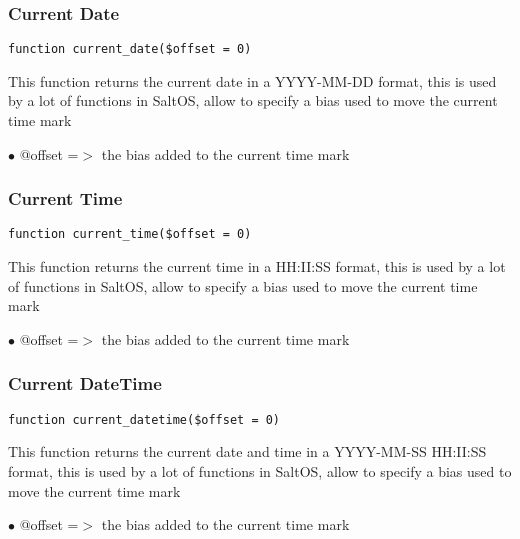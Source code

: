 \documentclass[a4paper]{article}
\begin{document}
\subsubsection{Current Date}

\begin{lstlisting}
function current_date($offset = 0)
\end{lstlisting}

This function returns the current date in a YYYY-MM-DD format, this is used
by a lot of functions in SaltOS, allow to specify a bias used to move the
current time mark

\begin{compactitem}
\item[\color{myblue}$\bullet$] @offset =$>$ the bias added to the current time mark
\end{compactitem}

\hypertarget{toc98}{}
\subsubsection{Current Time}

\begin{lstlisting}
function current_time($offset = 0)
\end{lstlisting}

This function returns the current time in a HH:II:SS format, this is used
by a lot of functions in SaltOS, allow to specify a bias used to move the
current time mark

\begin{compactitem}
\item[\color{myblue}$\bullet$] @offset =$>$ the bias added to the current time mark
\end{compactitem}

\hypertarget{toc99}{}
\subsubsection{Current DateTime}

\begin{lstlisting}
function current_datetime($offset = 0)
\end{lstlisting}

This function returns the current date and time in a YYYY-MM-SS HH:II:SS format,
this is used by a lot of functions in SaltOS, allow to specify a bias used to
move the current time mark

\begin{compactitem}
\item[\color{myblue}$\bullet$] @offset =$>$ the bias added to the current time mark
\end{compactitem}
\end{document}
